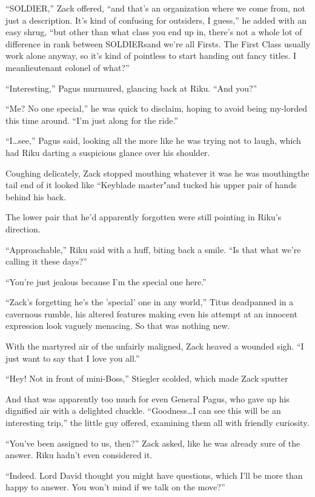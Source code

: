 ``SOLDIER,'' Zack offered, ``and that's an organization where we come from, not just a description. It's kind of confusing for outsiders, I guess,'' he added with an easy shrug, ``but other than what class you end up in, there's not a whole lot of difference in rank between SOLDIERs\textemdash and we're all Firsts. The First Class usually work alone anyway, so it's kind of pointless to start handing out fancy titles. I mean\textemdash lieutenant colonel of what?''

``Interesting,'' Pagus murmured, glancing back at Riku. ``And you?''

``Me? No one special,'' he was quick to disclaim, hoping to avoid being my-lorded this time around. ``I'm just along for the ride.''

``I\ldots see,'' Pagus said, looking all the more like he was trying not to laugh, which had Riku darting a suspicious glance over his shoulder.

Coughing delicately, Zack stopped mouthing whatever it was he was mouthing\textemdash the tail end of it looked like ``Keyblade master"\textemdash and tucked his upper pair of hands behind his back.

The lower pair that he'd apparently forgotten were still pointing in Riku's direction.

``Approachable,'' Riku said with a huff, biting back a smile. ``Is that what we're calling it these days?''

``You're just jealous because I'm the special one here.''

``Zack's forgetting he's the 'special' one in any world,'' Titus deadpanned in a cavernous rumble, his altered features making even his attempt at an innocent expression look vaguely menacing. So that was nothing new.

With the martyred air of the unfairly maligned, Zack heaved a wounded sigh. ``I just want to say that I love you all.''

``Hey! Not in front of mini-Boss,'' Stiegler scolded, which made Zack sputter\textemdash 

And that was apparently too much for even General Pagus, who gave up his dignified air with a delighted chuckle. ``Goodness\ldots I can see this will be an interesting trip,'' the little guy offered, examining them all with friendly curiosity.

``You've been assigned to us, then?'' Zack asked, like he was already sure of the answer. Riku hadn't even considered it.

``Indeed. Lord David thought you might have questions, which I'll be more than happy to answer. You won't mind if we talk on the move?''

